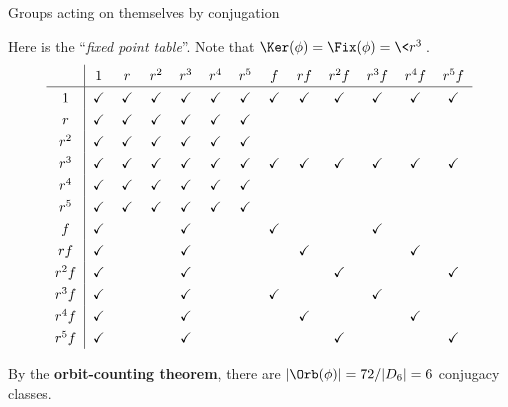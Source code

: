 \documentclass[8pt, handout]{beamer}
\newcommand{\Pause}{}      %
\begin{document}

\begin{frame}{Groups acting on themselves by conjugation} %

  Here is the ``\emph{fixed point table}''. Note that $\Ker(\phi)=\Fix(\phi)=\<r^3\>$. 
  \[
\renewcommand\arraystretch{1.3}
\begin{tabular}{c|cccccccccccc}
& $1$ & $r$ & $r^2$ & $r^3$ & $r^4$ & $r^5$ & $f$ & $rf$ & $r^2f$ & $r^3f$ & $r^4f$ & $r^5f$ \\ \hline
$1$ & \checkmark & \checkmark & \checkmark & \checkmark & \checkmark & \checkmark & \checkmark & \checkmark & \checkmark & \checkmark & \checkmark & \checkmark \\
$r$ & \checkmark & \checkmark & \checkmark & \checkmark & \checkmark & \checkmark & & & & & & \\
$r^2$ & \checkmark & \checkmark & \checkmark & \checkmark & \checkmark & \checkmark & & & & & & \\
$r^3$ & \checkmark & \checkmark & \checkmark & \checkmark & \checkmark & \checkmark & \checkmark & \checkmark & \checkmark & \checkmark & \checkmark & \checkmark \\
$r^4$ & \checkmark & \checkmark & \checkmark & \checkmark & \checkmark & \checkmark & & & & & & \\
$r^5$ & \checkmark & \checkmark & \checkmark & \checkmark & \checkmark & \checkmark & & & & & & \\
$f$ & \checkmark & & & \checkmark & & & \checkmark & & & \checkmark  & & \\
$rf$ & \checkmark & & & \checkmark & & & & \checkmark & & & \checkmark & \\
$r^2f$ & \checkmark & & & \checkmark & & & & & \checkmark & & & \checkmark \\
$r^3f$ & \checkmark & & & \checkmark & & & \checkmark & & & \checkmark & & \\
$r^4f$ & \checkmark & & & \checkmark & & & & \checkmark & & & \checkmark & \\
$r^5f$ & \checkmark & & & \checkmark & & & & & \checkmark & & & \checkmark \\
\end{tabular}
\]

By the \textbf{orbit-counting theorem}, there are 
$|\Orb(\phi)|=72/|D_6|=6$ conjugacy classes. 

\end{frame}

\end{document}
